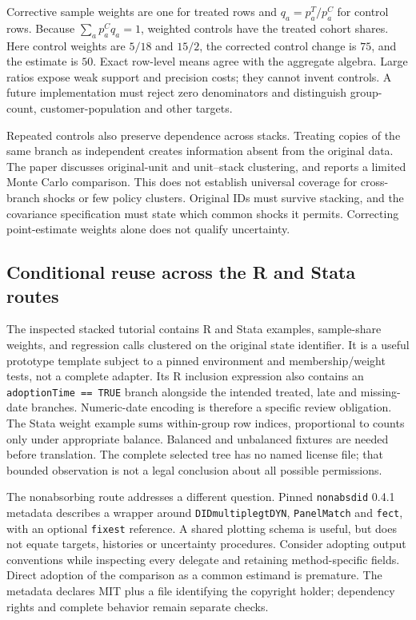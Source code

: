 Corrective sample weights are one for treated rows and $q_a=p_a^T/p_a^C$ for control rows. Because
$\sum_a p_a^Cq_a=1$, weighted controls have the treated cohort shares. Here control weights are $5/18$ and $15/2$,
the corrected control change is $75$, and the estimate is $50$. Exact row-level means agree with the aggregate algebra.
Large ratios expose weak support and precision costs; they cannot invent controls. A future implementation must reject
zero denominators and distinguish group-count, customer-population and other targets.~\citep{exec28_panel_wing,exec28_panel_reference}

Repeated controls also preserve dependence across stacks. Treating copies of the same branch as independent creates
information absent from the original data. The paper discusses original-unit and unit--stack clustering, and reports a
limited Monte Carlo comparison. This does not establish universal coverage for cross-branch shocks or few policy clusters.
Original IDs must survive stacking, and the covariance specification must state which common shocks it permits.
Correcting point-estimate weights alone does not qualify uncertainty.~\citep{exec28_panel_wing}

\subsection{Conditional reuse across the R and Stata routes}

The inspected stacked tutorial contains R and Stata examples, sample-share weights, and regression calls clustered on
the original state identifier. It is a useful prototype template subject to a pinned environment and membership/weight
tests, not a complete adapter. Its R inclusion expression also contains an \texttt{adoptionTime == TRUE} branch alongside
the intended treated, late and missing-date branches. Numeric-date encoding is therefore a specific review obligation.
The Stata weight example sums within-group row indices, proportional to counts only under appropriate balance.
Balanced and unbalanced fixtures are needed before translation. The complete selected tree has no named license file;
that bounded observation is not a legal conclusion about all possible permissions.~\citep{exec28_panel_software}

The nonabsorbing route addresses a different question. Pinned \texttt{nonabsdid} 0.4.1 metadata describes a wrapper around
\texttt{DIDmultiplegtDYN}, \texttt{PanelMatch} and \texttt{fect}, with an optional \texttt{fixest} reference.
A shared plotting schema is useful, but does not equate targets, histories or uncertainty procedures. Consider adopting
output conventions while inspecting every delegate and retaining method-specific fields. Direct adoption of the comparison
as a common estimand is premature. The metadata declares MIT plus a file identifying the copyright holder; dependency
rights and complete behavior remain separate checks.~\citep{exec28_panel_software}

